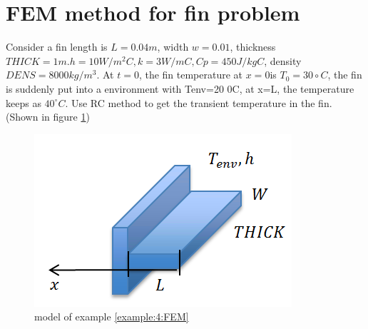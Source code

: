 \section{FEM method for fin problem}
\begin{example}
\label{example:4:FEM}
Consider a fin length is $L = 0.04 m$, width $w = 0.01$, thickness $THICK = 1 m. h = 10 W/m^2 C, k = 3 W/mC, Cp = 450 J/kg C$,
density $DENS = 8000 kg/m^3$. At $t=0$, the fin temperature at $x=0 $is $T_0=30\circ C$,
the fin is suddenly put into a environment with Tenv=20 0C, at x=L, the temperature keeps as $40^\circ C$.
Use RC method to get the transient temperature in the fin. (Shown in figure \ref{fig:4:5})
\begin{figure}[H]
  \centering
    \includegraphics[scale=0.8]{figures/ch4/5}
    \caption{model of example \ref{example:4:FEM}}
    \label{fig:4:5}
\end{figure}
\end{example}

